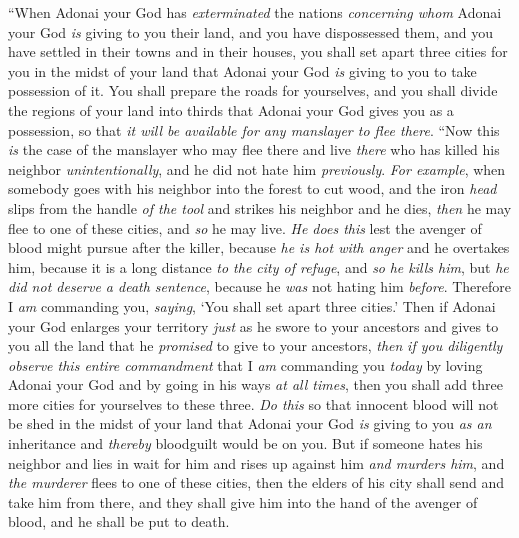 \begin{biblechapter} %
\verse “When Adonai your God has \textit{exterminated} the nations \textit{concerning whom} Adonai your God \textit{is} giving to you their land, and you have dispossessed them, and you have settled in their towns and in their houses,
\verse you shall set apart three cities for you in the midst of your land that Adonai your God \textit{is} giving to you to take possession of it.
\verse You shall prepare the roads for yourselves, and you shall divide the regions of your land into thirds that Adonai your God gives you as a possession, so that \textit{it will be available for any manslayer to flee there}.
\verse “Now this \textit{is} the case of the manslayer who may flee there and live \textit{there} who has killed his neighbor \textit{unintentionally}, and he did not hate him \textit{previously}.
\verse \textit{For example}, when somebody goes with his neighbor into the forest to cut wood, and the iron \textit{head} slips from the handle \textit{of the tool} and strikes his neighbor and he dies, \textit{then} he may flee to one of these cities, and \textit{so} he may live.
\verse \textit{He does this} lest the avenger of blood might pursue after the killer, because \textit{he is hot with anger} and he overtakes him, because it is a long distance \textit{to the city of refuge}, and \textit{so} \textit{he kills him}, but \textit{he did not deserve a death sentence}, because he \textit{was} not hating him \textit{before}.
\verse Therefore I \textit{am} commanding you, \textit{saying}, ‘You shall set apart three cities.’
\verse Then if Adonai your God enlarges your territory \textit{just} as he swore to your ancestors and gives to you all the land that he \textit{promised} to give to your ancestors,
\verse \textit{then} \textit{if you diligently observe this entire commandment} that I \textit{am} commanding you \textit{today} by loving Adonai your God and by going in his ways \textit{at all times}, then you shall add three more cities for yourselves to these three.
\verse \textit{Do this} so that innocent blood will not be shed in the midst of your land that Adonai your God \textit{is} giving to you \textit{as an} inheritance and \textit{thereby} bloodguilt would be on you.
\verse But if someone hates his neighbor and lies in wait for him and rises up against him \textit{and murders him}, and \textit{the murderer} flees to one of these cities,
\verse then the elders of his city shall send and take him from there, and they shall give him into the hand of the avenger of blood, and he shall be put to death.

\end{biblechapter}
